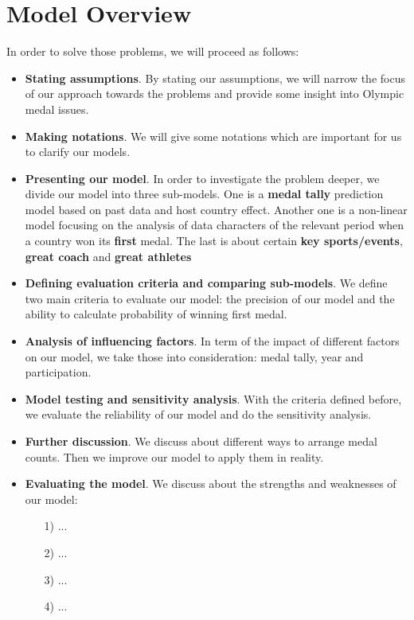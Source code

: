 \section{Model Overview}



In order to solve those problems, we will proceed as follows:

\begin{itemize}
    \begin{figure}[htbp]
        \centering
        \texttt{[image: ./figures/figure1\_work\_flow.png]}
        \caption{Flow chart of our work}
        \label{fig:example}
    \end{figure}
    
\item {\bf Stating assumptions}. By stating our assumptions, we will narrow the focus of our approach towards the problems and provide some insight into Olympic medal issues.

\item {\bf Making notations}. We will give some notations which are important for us to clarify our models.

\item {\bf Presenting our model}. In order to investigate the problem deeper, we divide our model into three sub-models. One is a \textbf{medal tally} prediction model based on past data and host country effect. 
Another one is a non-linear model focusing on the analysis of data characters of the relevant period when a country won its \textbf{first} medal.
The last is about certain \textbf{key sports/events}, \textbf{great coach} and \textbf{great athletes}

\item {\bf Defining evaluation criteria and comparing sub-models}. We define two main criteria to evaluate our model: the precision of our model and the ability to calculate probability of winning first medal.

\item {\bf Analysis of influencing factors}. In term of the impact of different factors on our model, we take those into consideration:
medal tally, year and participation.

\item {\bf Model testing and sensitivity analysis}. With the criteria defined before, we evaluate the reliability of our model and do the sensitivity analysis.

\item {\bf Further discussion}. We discuss about different ways to arrange medal counts. Then we improve our model to apply them in reality.

\item {\bf Evaluating the model}. We discuss about the strengths and weaknesses of our model:

\begin{itemize}
\item[1)] ... 
\item[2)] ...
\item[3)] ...
\item[4)] ...
\end{itemize}

\end{itemize}
